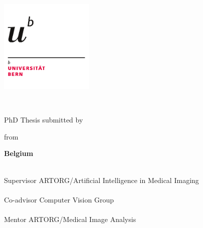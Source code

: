 \documentclass[
10pt, %
english, %
doublespacing, %
headsepline, %
]{MastersDoctoralThesis} %
\author{\textsc{Lejeune} Laurent}
\begin{document}
\frontmatter %

\pagestyle{plain} %



\begin{titlepage}

\hfill{\includegraphics[width=4.5cm]{Logo-unibe}}

\begin{center}

\vspace*{0.5cm}
{\Large \facname \\ \textsc{\univname} \par}\vspace{1cm} %

{\huge \bfseries \ttitle\par}\vspace{1cm} %
\large{PhD Thesis submitted by}\vspace{0.5cm}

{\Large \bfseries \authorname \par}\vspace{0.5cm}

\large{from }{\Large \bfseries Belgium \par}\vspace{0.5cm}

 
\vfill

\large{\supname \\ Supervisor ARTORG/Artificial Intelligence in Medical Imaging \\}\vspace{0.5cm}
\large{\examname \\  Co-advisor Computer Vision Group \\}\vspace{0.5cm}
\large{\mentname \\  Mentor ARTORG/Medical Image Analysis}\vspace{0.5cm}


\end{center}
\end{titlepage}
\end{document}
